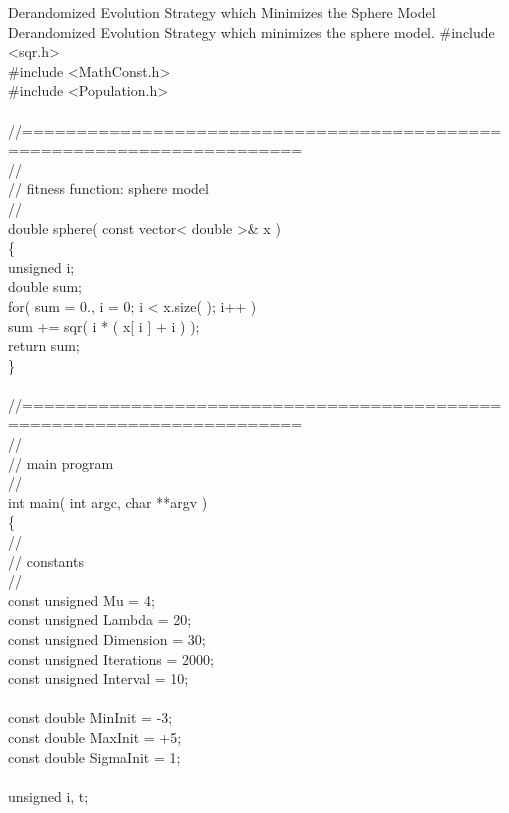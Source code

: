 \begin{programlisting}{Derandomized Evolution Strategy which Minimizes the Sphere Model}{
    Derandomized Evolution Strategy which minimizes the
    sphere model.}
#include <sqr.h>\\
#include <MathConst.h>\\
#include <Population.h>\\
\\
//=======================================================================\\
//\\
// fitness function: sphere model\\
//\\
double sphere( const vector< double >& x )\\
\{\\
    unsigned i;\\
    double   sum;\\
    for( sum = 0., i = 0; i < x.size( ); i++ )\\
        sum += sqr( i * ( x[ i ] + i ) );\\
    return sum;\\
\}\\
\\
//=======================================================================\\
//\\
// main program\\
//\\
int main( int argc, char **argv )\\
\{\\
    //\\
    // constants\\
    //\\
    const unsigned Mu           = 4;\\
    const unsigned Lambda       = 20;\\
    const unsigned Dimension    = 30;\\
    const unsigned Iterations   = 2000;\\
    const unsigned Interval     = 10;\\
\\
    const double   MinInit      = -3;\\
    const double   MaxInit      = +5;\\
    const double   SigmaInit    = 1;\\
\\
    unsigned       i, t;\\

\end{programlisting}
